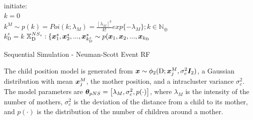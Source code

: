 \begin{algorithm}[H]
\SetAlgoLined
initiate:\\
$k = 0$\\
$k^M \sim p(k) = Poi(k;\lambda_M) = \frac{[\lambda_M]^k}{k!}exp\{-\lambda_M\};k\in\mathbb{N}_\oplus$\\
$k_\textrm{D}^s = k$\;
$\mathbb{X}_\textrm{D}^{NS_s}:\{\bm{x}_1^s,\bm{x}_2^s,...,\bm{x}_{k_\textrm{D}^s}^s \sim p(\bm{x}_1,\bm{x}_2,...,\bm{x}_{k_\textrm{D}}$\;
 \caption{Sequential Simulation - Neuman-Scott Event RF}
 \label{alg:SSNS}
\end{algorithm}

The child position model is generated from $\bm{x} \sim \phi_2(\textrm{D};\bm{x}_j^M, \sigma_c^2\bm{I}_2)$, a Gaussian distribution with mean $\bm{x}_j^M$, the mother position, and a intracluster variance $\sigma_c^2$. The model parameters are $\bm{\theta}_{pNS} = \left[\lambda_M,\sigma_c^2,p(\cdot)\right]$, where $\lambda_M$ is the intensity of the number of mothers, $\sigma_c^2$ is the deviation of the distance from a child to its mother, and $p(\cdot)$ is the distribution of the number of children around a mother.

